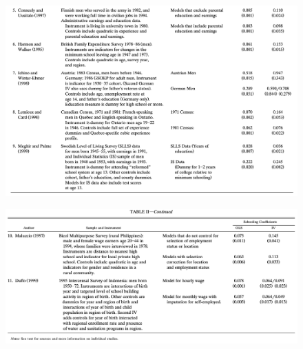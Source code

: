 \documentclass{beamer}
\begin{document}
\begin{frame}{}
\begin{figure}
    \centering
    \includegraphics[scale= .4]{Table2.2.png}
\end{figure}
\end{frame}  

\begin{frame}{}
\begin{figure}
    \centering
    \includegraphics[scale= .4]{Table2.3.png}
\end{figure}
\end{frame} 
\end{document}
